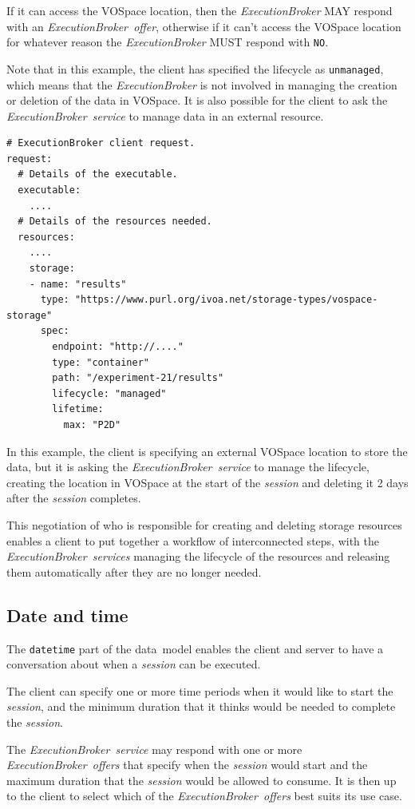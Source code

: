 \documentclass[11pt,a4paper]{ivoa}
\newcommand{\datamodel} {data~model}
\newcommand{\vospace} {VOSpace}
\newcommand{\execbrokerclass} {\textit{ExecutionBroker}}
\newcommand{\execbrokerservice}[1] {\textit{ExecutionBroker~service#1}}
\newcommand{\execoffer}[1] {\textit{ExecutionBroker~offer#1}}
\newcommand{\workerjob}[1] {\textit{session#1}}
\newcommand{\codeword}[1] {\texttt{#1}}
\begin{document}
If it can access the \vospace{} location, then the \execbrokerclass{} MAY respond
with an \execoffer{}, otherwise if it can't access the \vospace{} location for whatever
reason the \execbrokerclass{} MUST respond with \codeword{NO}.

Note that in this example, the client has specified the lifecycle as \codeword{unmanaged},
which means that the \execbrokerclass{} is not involved in managing the creation or deletion
of the data in \vospace.
It is also possible for the client to ask the \execbrokerservice{} to manage
data in an external resource.

\begin{lstlisting}[]
# ExecutionBroker client request.
request:
  # Details of the executable.
  executable:
    ....
  # Details of the resources needed.
  resources:
    ....
    storage:
    - name: "results"
      type: "https://www.purl.org/ivoa.net/storage-types/vospace-storage"
      spec:
        endpoint: "http://...."
        type: "container"
        path: "/experiment-21/results"
        lifecycle: "managed"
        lifetime:
          max: "P2D"
\end{lstlisting}

In this example, the client is specifying an external \vospace{} location to store the data,
but it is asking the \execbrokerservice{} to manage the lifecycle, creating the location
in \vospace{} at the start of the \workerjob{} and deleting it 2 days after the \workerjob{} completes.

This negotiation of who is responsible for creating and deleting storage resources
enables a client to put together a workflow of interconnected steps, with the
\execbrokerservice{s}
managing the lifecycle of the resources and releasing them automatically after they
are no longer needed.

\subsection{Date and time}
\label{date-time}

The \codeword{datetime} part of the \datamodel{} enables the client and server to have a
conversation about when a \workerjob{} can be executed.

The client can specify one or more time periods when it would like to start the \workerjob{},
and the minimum duration that it thinks would be needed to complete the \workerjob{}.

The \execbrokerservice{} may respond with one or more \execoffer{s} that specify when the \workerjob{}
would start and the maximum duration that the \workerjob{} would be allowed to consume.
It is then up to the client to select which of the \execoffer{s} best suits its use case.
\end{document}
